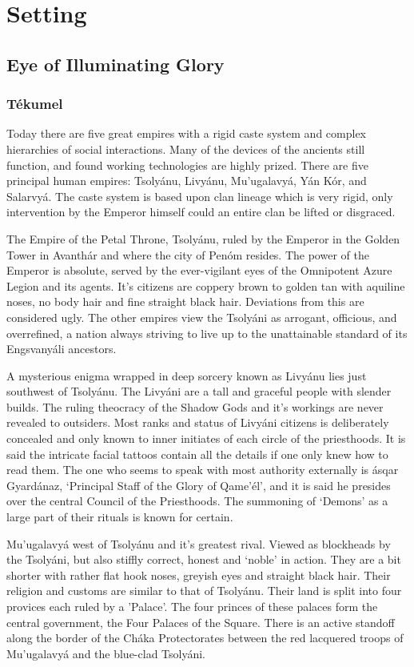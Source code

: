 \chapter{Setting}

\section{Eye of Illuminating Glory}

\subsection{Tékumel}

Today there are five great empires with a rigid caste system and complex hierarchies of social interactions. Many of the devices of the ancients still function, and found working technologies are highly prized. There are five principal human empires: Tsolyánu, Livyánu, Mu’ugalavyá, Yán Kór, and Salarvyá. The caste system is based upon clan lineage which is very rigid, only intervention by the Emperor himself could an entire clan be lifted or disgraced.

The Empire of the Petal Throne, Tsolyánu, ruled by the Emperor in the Golden Tower in Avanthár and where the city of Penóm resides. The power of the Emperor is absolute, served by the ever-vigilant eyes of the Omnipotent Azure Legion and its agents. It's citizens are coppery brown to golden tan with aquiline noses, no body hair and fine straight black hair. Deviations from this are considered ugly. The other empires view the Tsolyáni as arrogant, officious, and overrefined, a nation always striving to live up to the unattainable standard of its Engsvanyáli ancestors.

A mysterious enigma wrapped in deep sorcery known as Livyánu lies just southwest of Tsolyánu. The Livyáni are a tall and graceful people with slender builds. The ruling theocracy of the Shadow Gods and it's workings are never revealed to outsiders. Most ranks and status of Livyáni citizens is deliberately concealed and only known to inner initiates of each circle of the priesthoods. It is said the intricate facial tattoos contain all the details if one only knew how to read them. The one who seems to speak with most authority externally is ásqar Gyardánaz, ‘Principal Staff of the Glory of Qame’él’, and it is said he presides over the central Council of the Priesthoods. The summoning of `Demons' as a large part of their rituals is known for certain.

Mu’ugalavyá west of Tsolyánu and it's greatest rival. Viewed as blockheads by the Tsolyáni, but also stiffly correct, honest and `noble' in action. They are a bit shorter with rather flat hook noses, greyish eyes and straight black hair. Their religion and customs are similar to that of Tsolyánu. Their land is split into four provices each ruled by a 'Palace'. The four princes of these palaces form the central government, the Four Palaces of the Square. There is an active standoff along the border of the Cháka Protectorates between the red lacquered troops of Mu’ugalavyá and the blue-clad Tsolyáni.

